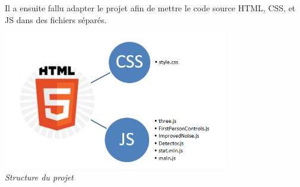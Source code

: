 Il a ensuite fallu adapter le projet afin de mettre le code source HTML, CSS, et JS dans des fichiers séparés.

\begin{center}
	\includegraphics[height=6cm]{images/ProFileOrganisation.png}\\
	\textit{Structure du projet}
\end{center}